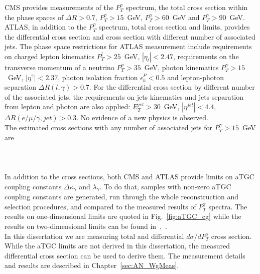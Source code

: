 CMS provides measurements of the $P_T^\gamma$ spectrum, the total cross section within the phase spaces of $\Delta R>0.7$, $P_T^\gamma>15$~GeV, $P_T^\gamma>60$~GeV and $P_T^\gamma>90$~GeV.\\

ATLAS, in addition to the $P_T^\gamma$ spectrum, total cross section and limits, provides the differential cross section and cross section with different number of associated jets. The phase space restrictions for ATLAS measurement include requirements on charged lepton kinematics $P_T^l>25$~GeV, $|\eta_l|<2.47$, requirements on the transverse momentum of a neutrino $P_T^\nu>35$~GeV, photon kinematics $P_T^\gamma>15$~GeV, $|\eta^\gamma|<2.37$, photon isolation fraction $\epsilon^P_h<0.5$ and lepton-photon separation $\Delta R(l,\gamma)>0.7$. For the differential cross section by different number of the associated jets, the requirements on jets kinematics and jets separation from lepton and photon are also applied: $E_T^{jet}>30$~GeV, $|\eta^{jet}|<4.4$, $\Delta R(e/\mu/\gamma,jet)>0.3$. No evidence of a new physics is observed.\\

The estimated cross sections with any number of associated jets for $P_T^\gamma>15$~GeV are \\
 \\
\\
\\

In addition to the cross sections, both CMS and ATLAS provide limits on aTGC coupling constants $\Delta \kappa_\gamma$ and $\lambda_\gamma$. To do that, samples with non-zero aTGC coupling constants are generated, run through the whole reconstruction and selection procedures, and compared to the measured results of $P_T^\gamma$ spectra. The results on one-dimensional limits are quoted in Fig.~\ref{fig:aTGC_cg} while the results on two-dimensional limits can be found in~\cite{ref_7TeV_ATLAS},~\cite{ref_7TeV_CMS}.\\

In this dissertation we are measuring total and differential $d\sigma/d P_T^\gamma$ cross section. While the aTGC limits are not derived in this dissertation, the measured differential cross section can be used to derive them. The measurement details and results are described in Chapter~\ref{sec:AN_WgMeas}.\\

